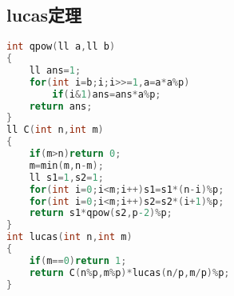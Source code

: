 \subsection{lucas定理}
\begin{lstlisting}[language=C]
int qpow(ll a,ll b)
{
	ll ans=1;
	for(int i=b;i;i>>=1,a=a*a%p)
		if(i&1)ans=ans*a%p;
	return ans;
}
ll C(int n,int m)
{
	if(m>n)return 0;
	m=min(m,n-m);
	ll s1=1,s2=1;
	for(int i=0;i<m;i++)s1=s1*(n-i)%p;
	for(int i=0;i<m;i++)s2=s2*(i+1)%p;
	return s1*qpow(s2,p-2)%p;
}
int lucas(int n,int m)
{
	if(m==0)return 1;
	return C(n%p,m%p)*lucas(n/p,m/p)%p;
}
\end{lstlisting} 
